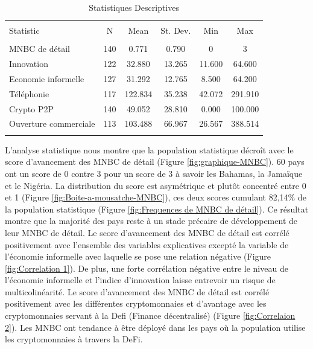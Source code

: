 \documentclass[12pt]{article}
\begin{document}
\begin{table}[!htbp] \centering 
  \caption{Statistiques Descriptives} 
  \label{} 
\begin{tabular}{@{\extracolsep{5pt}}lccccc} 
\\[-1.8ex]\hline 
\hline \\[-1.8ex] 
Statistic & \multicolumn{1}{c}{N} & \multicolumn{1}{c}{Mean} & \multicolumn{1}{c}{St. Dev.} & \multicolumn{1}{c}{Min} & \multicolumn{1}{c}{Max} \\ 
\hline \\[-1.8ex] 
MNBC de détail & 140 & 0.771 & 0.790 & 0 & 3 \\ 
Innovation & 122 & 32.880 & 13.265 & 11.600 & 64.600 \\ 
Economie informelle & 127 & 31.292 & 12.765 & 8.500 & 64.200 \\ 
Téléphonie & 117 & 122.834 & 35.238 & 42.072 & 291.910 \\ 
Crypto P2P & 140 & 49.052 & 28.810 & 0.000 & 100.000 \\ 
Ouverture commerciale & 113 & 103.488 & 66.967 & 26.567 & 388.514 \\ 
\hline \\[-1.8ex] 
\end{tabular} 
\label{tab:Statistiques descriptives}
\end{table} 

L'analyse statistique nous montre que la population statistique décroît avec le score d'avancement des MNBC de détail (Figure \ref{fig:graphique-MNBC}). 60 pays ont un score de 0 contre 3 pour un score de 3 à savoir les Bahamas, la Jamaïque et le Nigéria. La distribution du score est asymétrique et plutôt concentré entre 0 et 1 (Figure \ref{fig:Boite-a-mousatche-MNBC}), ces deux scores cumulant 82,14\% de la population statistique (Figure \ref{fig:Frequences de MNBC de détail}). Ce résultat montre que la majorité des pays reste à un stade précaire de développement de leur MNBC de détail. Le score d'avancement des MNBC de détail est corrélé positivement avec l'ensemble des variables explicatives excepté la variable de l'économie informelle avec laquelle se pose une relation négative (Figure \ref{fig:Correlation 1}). De plus, une forte corrélation négative entre le niveau de l'économie informelle et l'indice d'innovation laisse entrevoir un risque de multicolinéarité. Le score d'avancement des MNBC de détail est corrélé positivement avec les différentes cryptomonnaies et d'avantage avec les cryptomonnaies servant à la Defi (Finance décentralisé) (Figure \ref{fig:Correlaion 2}). Les MNBC ont tendance à être déployé dans les pays où la population utilise les cryptomonnaies à travers la DeFi. \\
\end{document}
